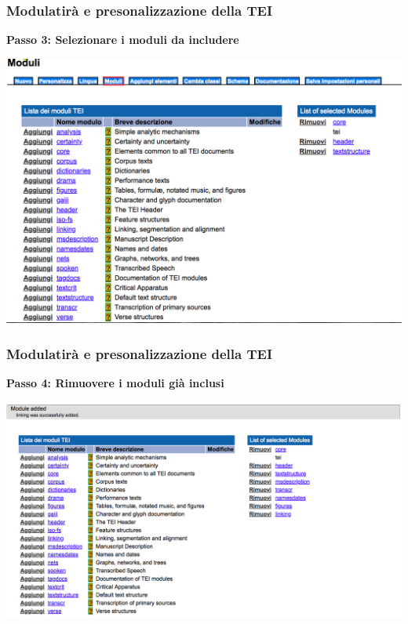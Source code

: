 \begin{frame}
    \frametitle{Modulatirà e presonalizzazione della TEI}
    \addtocounter{nframe}{1}
    
    \textbf{Passo 3: Selezionare i moduli da includere}

     \begin{center}
        \includegraphics[width=.9\textwidth]{imgs/Roma4.png}
     \end{center}
   
    
\end{frame}

\begin{frame}
    \frametitle{Modulatirà e presonalizzazione della TEI}
    \addtocounter{nframe}{1}
    
    \textbf{Passo 4:  Rimuovere i moduli già inclusi}


     \begin{center}
        \includegraphics[width=.97\textwidth]{imgs/Roma5.png}
     \end{center}
   
    
\end{frame}

